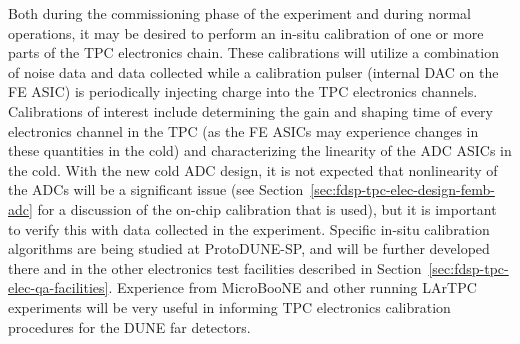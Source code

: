 Both during the commissioning phase of the experiment and during normal operations, it may
be desired to perform an in-situ calibration of one or more parts of the TPC electronics chain.
These calibrations will utilize a combination of noise data and data collected while a
calibration pulser (internal DAC on the FE ASIC) is periodically injecting charge into the TPC
electronics channels.  Calibrations of interest include determining the gain and shaping time of
every electronics channel in the TPC (as the FE ASICs may experience changes in these quantities
in the cold) and characterizing the linearity of the ADC ASICs in the cold.  With the new cold ADC
design, it is not expected that nonlinearity of the ADCs will be a significant issue (see
Section~\ref{sec:fdsp-tpc-elec-design-femb-adc} for a discussion of the on-chip calibration
that is used), but it is important to verify this with data collected in the experiment.
Specific in-situ calibration algorithms are being studied at ProtoDUNE-SP, and will be further
developed there and in the other electronics test facilities described in
Section~\ref{sec:fdsp-tpc-elec-qa-facilities}.  Experience from MicroBooNE and other running
LArTPC experiments will be very useful in informing TPC electronics calibration procedures for
the DUNE far detectors.
